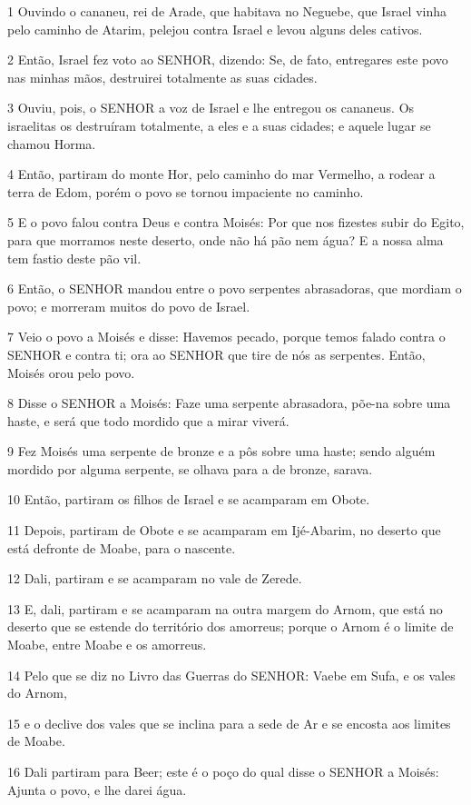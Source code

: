 \par 1 Ouvindo o cananeu, rei de Arade, que habitava no Neguebe, que Israel vinha pelo caminho de Atarim, pelejou contra Israel e levou alguns deles cativos.
\par 2 Então, Israel fez voto ao SENHOR, dizendo: Se, de fato, entregares este povo nas minhas mãos, destruirei totalmente as suas cidades.
\par 3 Ouviu, pois, o SENHOR a voz de Israel e lhe entregou os cananeus. Os israelitas os destruíram totalmente, a eles e a suas cidades; e aquele lugar se chamou Horma.
\par 4 Então, partiram do monte Hor, pelo caminho do mar Vermelho, a rodear a terra de Edom, porém o povo se tornou impaciente no caminho.
\par 5 E o povo falou contra Deus e contra Moisés: Por que nos fizestes subir do Egito, para que morramos neste deserto, onde não há pão nem água? E a nossa alma tem fastio deste pão vil.
\par 6 Então, o SENHOR mandou entre o povo serpentes abrasadoras, que mordiam o povo; e morreram muitos do povo de Israel.
\par 7 Veio o povo a Moisés e disse: Havemos pecado, porque temos falado contra o SENHOR e contra ti; ora ao SENHOR que tire de nós as serpentes. Então, Moisés orou pelo povo.
\par 8 Disse o SENHOR a Moisés: Faze uma serpente abrasadora, põe-na sobre uma haste, e será que todo mordido que a mirar viverá.
\par 9 Fez Moisés uma serpente de bronze e a pôs sobre uma haste; sendo alguém mordido por alguma serpente, se olhava para a de bronze, sarava.
\par 10 Então, partiram os filhos de Israel e se acamparam em Obote.
\par 11 Depois, partiram de Obote e se acamparam em Ijé-Abarim, no deserto que está defronte de Moabe, para o nascente.
\par 12 Dali, partiram e se acamparam no vale de Zerede.
\par 13 E, dali, partiram e se acamparam na outra margem do Arnom, que está no deserto que se estende do território dos amorreus; porque o Arnom é o limite de Moabe, entre Moabe e os amorreus.
\par 14 Pelo que se diz no Livro das Guerras do SENHOR: Vaebe em Sufa, e os vales do Arnom,
\par 15 e o declive dos vales que se inclina para a sede de Ar e se encosta aos limites de Moabe.
\par 16 Dali partiram para Beer; este é o poço do qual disse o SENHOR a Moisés: Ajunta o povo, e lhe darei água.
